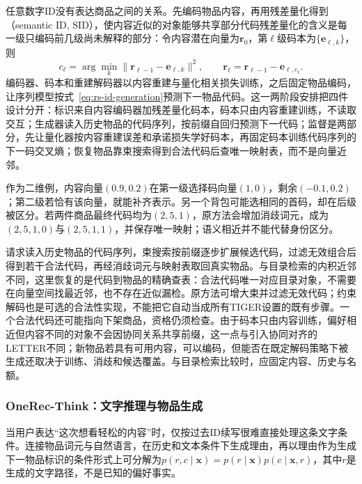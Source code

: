 任意数字ID没有表达商品之间的关系。先编码物品内容，再用残差量化得到（semantic ID, SID），使内容近似的对象能够共享部分代码残差量化的含义是每一级只编码前几级尚未解释的部分：令内容潜在向量为$\bm r_0$，第$\ell$级码本为$\{\bm e_{\ell,k}\}$，则
\begin{equation}
 c_\ell=\arg\min_k\|\bm r_{\ell-1}-\bm e_{\ell,k}\|^2,\qquad
 \bm r_\ell=\bm r_{\ell-1}-\bm e_{\ell,c_\ell}.
 \label{eq:rs-tiger-rq}
\end{equation}
编码器、码本和重建解码器以内容重建与量化相关损失训练，之后固定物品编码，让序列模型按式~\eqref{eq:rs-id-generation}预测下一物品代码。这一两阶段安排把四件设计分开：标识来自内容编码器加残差量化码本，码本只由内容重建训练，不读取交互；生成器读入历史物品的代码序列，按前缀自回归预测下一代码；监督是两部分，先让量化器按内容重建误差和承诺损失学好码本，再固定码本训练代码序列的下一码交叉熵；恢复物品靠束搜索得到合法代码后查唯一映射表，而不是向量近邻。

作为二维例，内容向量$(0.9,0.2)$在第一级选择码向量$(1,0)$，剩余$(-0.1,0.2)$；第二级若恰有该向量，就能补齐表示。另一个背包可能选相同的首码，却在后级被区分。若两件商品最终代码均为$(2,5,1)$，原方法会增加消歧词元，成为$(2,5,1,0)$与$(2,5,1,1)$，并保存唯一映射；语义相近并不能代替身份区分。

请求读入历史物品的代码序列，束搜索按前缀逐步扩展候选代码，过滤无效组合后得到若干合法代码，再经消歧词元与映射表取回真实物品。与目录检索的内积近邻不同，这里恢复的是代码到物品的精确查表：合法代码唯一对应目录对象，不需要在向量空间找最近邻，也不存在近似漏检。原方法可增大束并过滤无效代码；约束解码也是可选的合法性实现，不能把它自动当成所有TIGER设置的既有步骤。一个合法代码还可能指向下架商品，资格仍须检查。由于码本只由内容训练，偏好相近但内容不同的对象不会因协同关系共享前缀，这一点与引入协同对齐的LETTER不同；新物品若具有可用内容，可以编码，但能否在既定解码策略下被生成还取决于训练、消歧和候选覆盖。与目录检索比较时，应固定内容、历史与名额。

\Needspace{110mm}
\subsubsection{OneRec-Think：文字推理与物品生成}
\label{sec:rs-onerec-think}

当用户表达“这次想看轻松的内容”时，仅按过去ID续写很难直接处理这条文字条件。连接物品词元与自然语言，在历史和文本条件下生成理由，再以理由作为生成下一物品标识的条件形式上可分解为$p(r,c\mid\bm x)=p(r\mid\bm x)p(c\mid\bm x,r)$，其中$r$是生成的文字路径，不是已知的偏好事实。

